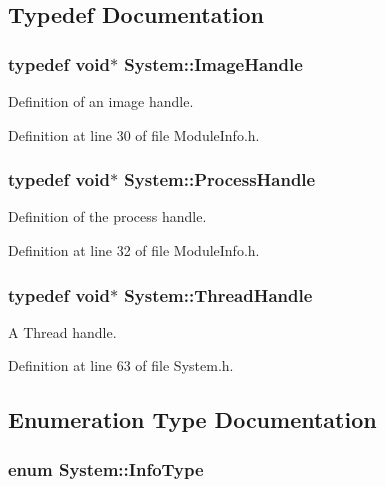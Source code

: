 \subsection{Typedef Documentation}
\hypertarget{namespaceSystem_a21dca3f6170a2b0a0ea3028040ba21b3}{
\subsubsection[{ImageHandle}]{\setlength{\rightskip}{0pt plus 5cm}typedef void$\ast$ {\bf System::ImageHandle}}}
\label{namespaceSystem_a21dca3f6170a2b0a0ea3028040ba21b3}


Definition of an image handle. 

Definition at line 30 of file ModuleInfo.h.\hypertarget{namespaceSystem_a7490ee4911e28ad26aa0fcdd00a629df}{
\subsubsection[{ProcessHandle}]{\setlength{\rightskip}{0pt plus 5cm}typedef void$\ast$ {\bf System::ProcessHandle}}}
\label{namespaceSystem_a7490ee4911e28ad26aa0fcdd00a629df}


Definition of the process handle. 

Definition at line 32 of file ModuleInfo.h.\hypertarget{namespaceSystem_ad0b1bc3494d9fecebf85204f61224ac6}{
\subsubsection[{ThreadHandle}]{\setlength{\rightskip}{0pt plus 5cm}typedef void$\ast$ {\bf System::ThreadHandle}}}
\label{namespaceSystem_ad0b1bc3494d9fecebf85204f61224ac6}


A Thread handle. 

Definition at line 63 of file System.h.

\subsection{Enumeration Type Documentation}
\hypertarget{namespaceSystem_a71a46d52920ca8e98fc4649949be58a7}{
\subsubsection[{InfoType}]{\setlength{\rightskip}{0pt plus 5cm}enum {\bf System::InfoType}}}
\label{namespaceSystem_a71a46d52920ca8e98fc4649949be58a7}


